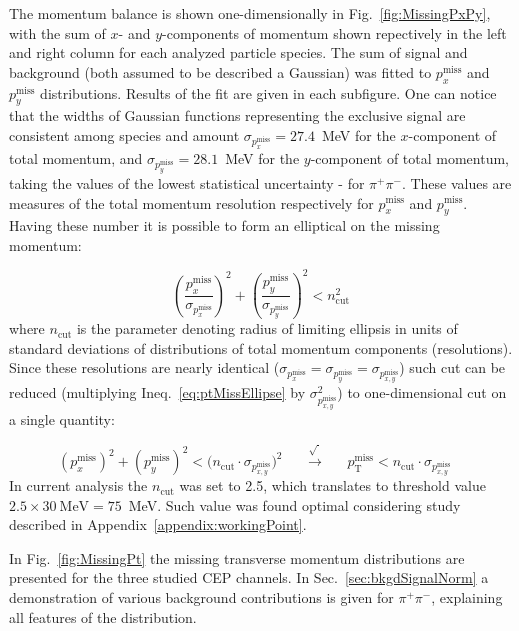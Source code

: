 The momentum balance is shown one-dimensionally in Fig.~\ref{fig:MissingPxPy}, with the sum of $x$- and $y$-components of momentum shown repectively in the left and right column for each analyzed particle species. The sum of signal and background (both assumed to be described a Gaussian) was fitted to $p_{x}^{\text{miss}}$ and $p_{y}^{\text{miss}}$ distributions. Results of the fit are given in each subfigure. One can notice that the widths of Gaussian functions representing the exclusive signal are consistent among species and amount $\sigma_{p_{x}^{\text{miss}}}=27.4$~MeV for the $x$-component of total momentum, and $\sigma_{p_{y}^{\text{miss}}}=28.1$~MeV for the $y$-component of total momentum, taking the values of the lowest statistical uncertainty - for $\pi^{+}\pi^{-}$. These values are measures of the total momentum resolution respectively for $p_{x}^{\text{miss}}$ and $p_{y}^{\text{miss}}$. Having these number it is possible to form an elliptical on the missing momentum:

\begin{equation}\label{eq:ptMissEllipse}%
\left(\frac{p_{x}^{\text{miss}}}{\sigma_{p_{x}^{\text{miss}}}}\right)^{2} + \left(\frac{p_{y}^{\text{miss}}}{\sigma_{p_{y}^{\text{miss}}}}\right)^{2} < n_{\text{cut}}^{2}
\end{equation}
%
where $n_{\text{cut}}$ is the parameter denoting radius of limiting ellipsis in units of standard deviations of distributions of total momentum components (resolutions). Since these resolutions are nearly identical ($\sigma_{p_{x}^{\text{miss}}} = \sigma_{p_{y}^{\text{miss}}} = \sigma_{p_{x,y}^{\text{miss}}}$) such cut can be reduced (multiplying Ineq.~\ref{eq:ptMissEllipse} by $\sigma_{p_{x,y}^{\text{miss}}}^{2}$) to one-dimensional cut on a single quantity:

\begin{equation}%
\left(p_{x}^{\text{miss}}\right)^{2} + \left(p_{y}^{\text{miss}}\right)^{2} < \Big(n_{\text{cut}}\cdot\sigma_{p_{x,y}^{\text{miss}}}\Big)^{2}~~~~~~~\xrightarrow[~]{\sqrt{~}}~~~~~~~p_{\text{T}}^{\text{miss}} < n_{\text{cut}}\cdot\sigma_{p_{x,y}^{\text{miss}}}~~~~
\end{equation}%
%
In current analysis the $n_{\text{cut}}$ was set to 2.5, which translates to threshold value $2.5\times 30~\text{MeV} = 75$~MeV. Such value was found optimal considering study described in Appendix~\ref{appendix:workingPoint}.

In Fig.~\ref{fig:MissingPt} the missing transverse momentum distributions are presented for the three studied CEP channels. In Sec.~\ref{sec:bkgdSignalNorm} a demonstration of various background contributions is given for $\pi^{+}\pi^{-}$, explaining all features of the distribution.



